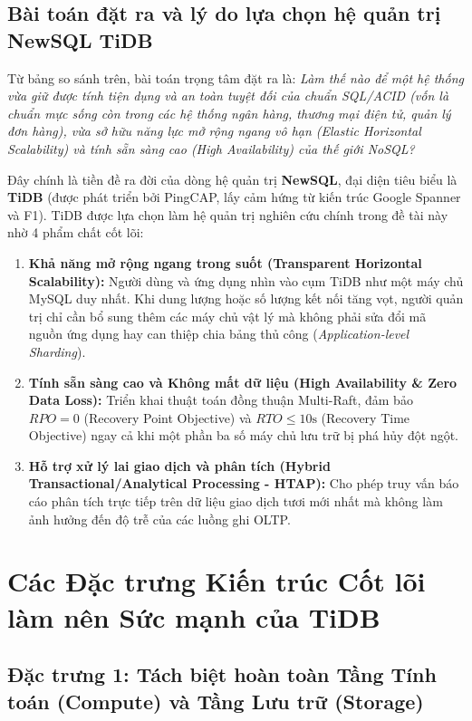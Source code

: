 \subsection{Bài toán đặt ra và lý do lựa chọn hệ quản trị NewSQL TiDB}

Từ bảng so sánh trên, bài toán trọng tâm đặt ra là: \textit{Làm thế nào để một hệ thống vừa giữ được tính tiện dụng và an toàn tuyệt đối của chuẩn SQL/ACID (vốn là chuẩn mực sống còn trong các hệ thống ngân hàng, thương mại điện tử, quản lý đơn hàng), vừa sở hữu năng lực mở rộng ngang vô hạn (Elastic Horizontal Scalability) và tính sẵn sàng cao (High Availability) của thế giới NoSQL?}

Đây chính là tiền đề ra đời của dòng hệ quản trị \textbf{NewSQL}, đại diện tiêu biểu là \textbf{TiDB} (được phát triển bởi PingCAP, lấy cảm hứng từ kiến trúc Google Spanner và F1). TiDB được lựa chọn làm hệ quản trị nghiên cứu chính trong đề tài này nhờ 4 phẩm chất cốt lõi:
\begin{enumerate}
  \item \textbf{Khả năng mở rộng ngang trong suốt (Transparent Horizontal Scalability):} Người dùng và ứng dụng nhìn vào cụm TiDB như một máy chủ MySQL duy nhất. Khi dung lượng hoặc số lượng kết nối tăng vọt, người quản trị chỉ cần bổ sung thêm các máy chủ vật lý mà không phải sửa đổi mã nguồn ứng dụng hay can thiệp chia bảng thủ công (\textit{Application-level Sharding}).
  \item \textbf{Tính sẵn sàng cao và Không mất dữ liệu (High Availability \& Zero Data Loss):} Triển khai thuật toán đồng thuận Multi-Raft, đảm bảo $RPO = 0$ (Recovery Point Objective) và $RTO \le 10\text{s}$ (Recovery Time Objective) ngay cả khi một phần ba số máy chủ lưu trữ bị phá hủy đột ngột.
  \item \textbf{Hỗ trợ xử lý lai giao dịch và phân tích (Hybrid Transactional/Analytical Processing - HTAP):} Cho phép truy vấn báo cáo phân tích trực tiếp trên dữ liệu giao dịch tươi mới nhất mà không làm ảnh hưởng đến độ trễ của các luồng ghi OLTP.
\end{enumerate}

\section{Các Đặc trưng Kiến trúc Cốt lõi làm nên Sức mạnh của TiDB}
\label{sec:phan_a_kien_truc_tidb}

\subsection{Đặc trưng 1: Tách biệt hoàn toàn Tầng Tính toán (Compute) và Tầng Lưu trữ (Storage)}

